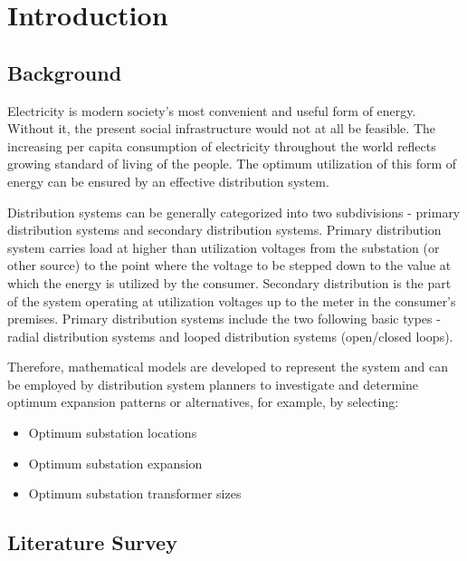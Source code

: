 \documentclass[a4paper,12pt,oneside]{report}%
\begin{document}
 \newpage
\tableofcontents 	\cleardoublepage%
%

\chapter{Introduction}
\label{chapintro}
\section{Background}
Electricity is modern society's most convenient and useful form of energy. Without it, the present social infrastructure would not at all be feasible. The increasing per capita consumption of electricity throughout the world reflects growing standard of living of the people. The optimum utilization of this form of energy can be ensured by an effective distribution system.
\par
Distribution systems can be generally categorized into two subdivisions - primary distribution systems and secondary distribution systems. Primary distribution system carries load at higher than utilization voltages from the substation (or other source) to the point where the voltage to be stepped down to the value at which the energy is utilized by the consumer. Secondary distribution is the part of the system operating at utilization voltages up to the meter in the consumer's premises. Primary distribution systems include the two following basic types - radial distribution systems and looped distribution systems (open/closed loops).

Therefore, mathematical models are developed to represent the system and can be employed by distribution system planners to investigate and determine optimum expansion patterns or alternatives, for example, by selecting:
\begin{itemize}
\item Optimum substation locations
\item Optimum substation expansion
\item Optimum substation transformer sizes
\end{itemize}

\section{Literature Survey}
\label{litersurvey}
\end{document}
